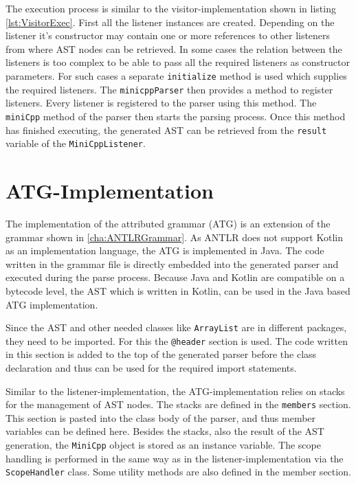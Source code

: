 The execution process is similar to the visitor-implementation shown in listing \ref{lst:VisitorExec}. First all the listener instances are created. Depending on the listener it's constructor may contain one or more references to other listeners from where AST nodes can be retrieved. In some cases the relation between the listeners is too complex to be able to pass all the required listeners as constructor parameters. For such cases a separate \verb|initialize| method is used which supplies the required listeners. The \verb|minicppParser| then provides a method to register listeners. Every listener is registered to the parser using this method. The \verb|miniCpp| method of the parser then starts the parsing process. Once this method has finished executing, the generated AST can be retrieved from the \verb|result| variable of the \verb|MiniCppListener|.

\section{ATG-Implementation}

The implementation of the attributed grammar (ATG) is an extension of the grammar shown in \ref{cha:ANTLRGrammar}. As ANTLR does not support Kotlin as an implementation language, the ATG is implemented in Java. The code written in the grammar file is directly embedded into the generated parser and executed during the parse process. Because Java and Kotlin are compatible on a bytecode level, the AST which is written in Kotlin, can be used in the Java based ATG implementation. 

Since the AST and other needed classes like \verb|ArrayList| are in different packages, they need to be imported. For this the \verb|@header| section is used. The code written in this section is added to the top of the generated parser before the class declaration and thus can be used for the required import statements. 

Similar to the listener-implementation, the ATG-implementation relies on stacks for the management of AST nodes. The stacks are defined in the \verb|members| section. This section is pasted into the class body of the parser, and thus member variables can be defined here. Besides the stacks, also the result of the AST generation, the \verb|MiniCpp| object is stored as an instance variable. The scope handling is performed in the same way as in the listener-implementation via the \verb|ScopeHandler| class. Some utility methods are also defined in the member section. 


